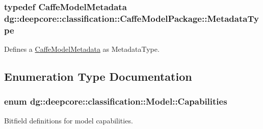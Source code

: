 \subsubsection[{\texorpdfstring{Metadata\+Type}{MetadataType}}]{\setlength{\rightskip}{0pt plus 5cm}typedef Caffe\+Model\+Metadata {\bf dg\+::deepcore\+::classification\+::\+Caffe\+Model\+Package\+::\+Metadata\+Type}}\hypertarget{group___classification_module_gae0f23f2d134e0b3fc83b807077e32e8b}{}\label{group___classification_module_gae0f23f2d134e0b3fc83b807077e32e8b}


Defines a \hyperlink{structdg_1_1deepcore_1_1classification_1_1_caffe_model_metadata}{Caffe\+Model\+Metadata} as Metadata\+Type. 



\subsection{Enumeration Type Documentation}
\subsubsection[{\texorpdfstring{Capabilities}{Capabilities}}]{\setlength{\rightskip}{0pt plus 5cm}enum {\bf dg\+::deepcore\+::classification\+::\+Model\+::\+Capabilities}}\hypertarget{group___classification_module_gabbae0a103af9e91d0afd0d4cc84b2be4}{}\label{group___classification_module_gabbae0a103af9e91d0afd0d4cc84b2be4}


Bitfield definitions for model capabilities. 

